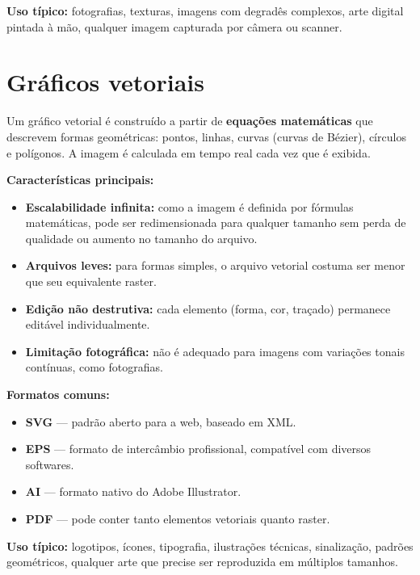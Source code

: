 \documentclass[a4paper,12pt]{article}
\begin{document}
\medskip
\noindent \textbf{Uso típico:} fotografias, texturas, imagens com degradês complexos, arte digital pintada à mão, qualquer imagem capturada por câmera ou scanner.

\section{Gráficos vetoriais}

Um gráfico vetorial é construído a partir de \textbf{equações matemáticas} que descrevem formas geométricas: pontos, linhas, curvas (curvas de Bézier), círculos e polígonos. A imagem é calculada em tempo real cada vez que é exibida.

\bigskip
\noindent \textbf{Características principais:}

\begin{itemize}[nosep]
  \item \textbf{Escalabilidade infinita:} como a imagem é definida por fórmulas matemáticas, pode ser redimensionada para qualquer tamanho sem perda de qualidade ou aumento no tamanho do arquivo.
  \item \textbf{Arquivos leves:} para formas simples, o arquivo vetorial costuma ser menor que seu equivalente raster.
  \item \textbf{Edição não destrutiva:} cada elemento (forma, cor, traçado) permanece editável individualmente.
  \item \textbf{Limitação fotográfica:} não é adequado para imagens com variações tonais contínuas, como fotografias.
\end{itemize}

\medskip
\noindent \textbf{Formatos comuns:}

\begin{itemize}[nosep]
  \item \textbf{SVG} --- padrão aberto para a web, baseado em XML.
  \item \textbf{EPS} --- formato de intercâmbio profissional, compatível com diversos softwares.
  \item \textbf{AI} --- formato nativo do Adobe Illustrator.
  \item \textbf{PDF} --- pode conter tanto elementos vetoriais quanto raster.
\end{itemize}

\medskip
\noindent \textbf{Uso típico:} logotipos, ícones, tipografia, ilustrações técnicas, sinalização, padrões geométricos, qualquer arte que precise ser reproduzida em múltiplos tamanhos.
\end{document}
